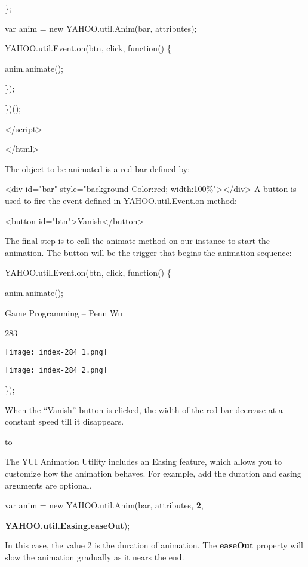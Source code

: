 \documentclass[
]{article}
\begin{document}
\};

var anim = new YAHOO.util.Anim(\textquotesingle bar\textquotesingle,
attributes);

YAHOO.util.Event.on(\textquotesingle btn\textquotesingle,
\textquotesingle click\textquotesingle, function() \{

anim.animate();

\});

\})();

\textless/script\textgreater{}

\textless/html\textgreater{}

The object to be animated is a red bar defined by:

\textless div id="bar" style="background-Color:red;
width:100\%"\textgreater\textless/div\textgreater{} A button is used to
fire the event defined in YAHOO.util.Event.on method:

\textless button
id="btn"\textgreater Vanish\textless/button\textgreater{}

The final step is to call the animate method on our instance to start
the animation. The button will be the trigger that begins the animation
sequence:

YAHOO.util.Event.on(\textquotesingle btn\textquotesingle,
\textquotesingle click\textquotesingle, function() \{

anim.animate();

Game Programming -- Penn Wu

283

\protect\hypertarget{index_split_015.htmlux5cux23p284}{}{}\texttt{[image: index-284\_1.png]}

\texttt{[image: index-284\_2.png]}

\});

When the ``Vanish'' button is clicked, the width of the red bar decrease
at a constant speed till it disappears.

to

The YUI Animation Utility includes an Easing feature, which allows you
to customize how the animation behaves. For example, add the duration
and easing arguments are optional.

var anim = new YAHOO.util.Anim(\textquotesingle bar\textquotesingle,
attributes, \textbf{2},

\textbf{YAHOO.util.Easing.easeOut});

In this case, the value 2 is the duration of animation. The
\textbf{easeOut} property will slow the animation gradually as it nears
the end.
\end{document}
